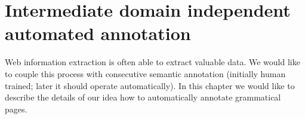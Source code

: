 \documentclass{sig-alternate}
\begin{document}
\section{Intermediate domain independent automated annotation}
Web information extraction is often able to extract valuable data. We would like to couple this process with consecutive semantic annotation (initially human trained; later it should operate automatically). In this chapter we would like to describe the details of our idea how to automatically annotate grammatical pages.



\end{document}
